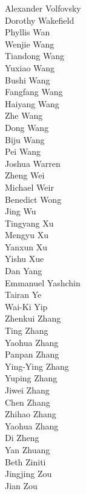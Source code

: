 Alexander Volfovsky\\
Dorothy Wakefield\\
Phyllis Wan\\
Wenjie Wang\\
Tiandong Wang\\
Yuxiao Wang\\
Bushi Wang\\
Fangfang Wang\\
Haiyang Wang\\
Zhe Wang\\
Dong Wang\\
Biju Wang\\
Pei Wang\\
Joshua Warren\\
Zheng Wei\\
Michael Weir\\
Benedict Wong\\
Jing Wu\\
Tingyang Xu\\
Mengyu Xu\\
Yanxun Xu\\
Yishu Xue\\
Dan Yang\\
Emmanuel Yashchin\\
Tairan Ye\\
Wai-Ki Yip\\
Zhenkui Zhang\\
Ting Zhang\\
Yaohua  Zhang\\
Panpan Zhang\\
Ying-Ying Zhang\\
Yuping Zhang\\
Jiwei Zhang\\
Chen Zhang\\
Zhihao Zhang\\
Yaohua Zhang\\
Di Zheng\\
Yan Zhuang\\
Beth Ziniti\\
Jingjing Zou\\
Jian Zou\\
